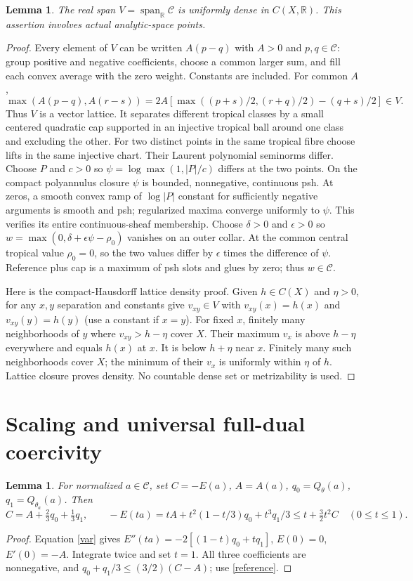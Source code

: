 \documentclass[11pt]{article}
\newtheorem{lemma}[theorem]{Lemma}
\newcommand{\C}{\mathcal C}
\newcommand{\R}{\mathbb R}
\begin{document}
\begin{lemma}\label{dense}
The real span $V=\operatorname{span}_{\R}\C$ is uniformly dense in
$C(X,\R)$. This assertion involves actual analytic-space points.
\end{lemma}
\begin{proof}
Every element of $V$ can be written $A(p-q)$ with $A>0$ and $p,q\in\C$:
group positive and negative coefficients, choose a common larger sum,
and fill each convex average with the zero weight. Constants are included.
For common $A$,
\[
 \max(A(p-q),A(r-s))
 =2A\left[\max((p+s)/2,(r+q)/2)-(q+s)/2\right]\in V.
\]
Thus $V$ is a vector lattice. It separates different tropical classes
by a small centered quadratic cap supported in an injective tropical ball
around one class and excluding the other. For two distinct points in
the same tropical fibre choose lifts in the same injective chart.
Their Laurent polynomial seminorms differ. Choose $P$ and $c>0$ so
$\psi=\log\max(1,|P|/c)$ differs at the two points. On the compact
polyannulus closure $\psi$ is bounded, nonnegative, continuous psh.
At zeros, a smooth convex ramp of $\log|P|$ constant for sufficiently
negative arguments is smooth and psh; regularized maxima converge
uniformly to $\psi$. This verifies its entire continuous-sheaf membership.
Choose $\delta>0$ and $\epsilon>0$ so
$w=\max(0,\delta+\epsilon\psi-\rho_0)$ vanishes on an outer
collar. At the common central tropical value $\rho_0=0$, so the two
values differ by $\epsilon$ times the difference of $\psi$. Reference
plus cap is a maximum of psh slots and glues by zero; thus $w\in\C$.

Here is the compact-Hausdorff lattice density proof. Given $h\in C(X)$
and $\eta>0$, for any $x,y$ separation and constants give $v_{xy}\in V$
with $v_{xy}(x)=h(x)$ and $v_{xy}(y)=h(y)$ (use a constant if $x=y$).
For fixed $x$, finitely many neighborhoods of $y$ where
$v_{xy}>h-\eta$ cover $X$. Their maximum $v_x$ is above $h-\eta$
everywhere and equals $h(x)$ at $x$. It is below $h+\eta$ near $x$.
Finitely many such neighborhoods cover $X$; the minimum of their $v_x$
is uniformly within $\eta$ of $h$. Lattice closure proves density.
No countable dense set or metrizability is used.
\end{proof}

\section{Scaling and universal full-dual coercivity}
\begin{lemma}\label{scale}
For normalized $a\in\C$, set $C=-E(a)$, $A=A(a)$,
$q_0=Q_\theta(a)$, $q_1=Q_{\theta_a}(a)$. Then
\[
 C=A+\tfrac23q_0+\tfrac13q_1,\qquad
 -E(ta)=tA+t^2(1-t/3)q_0+t^3q_1/3
 \le t+\tfrac32t^2C\quad(0\le t\le1).
\]
\end{lemma}
\begin{proof}
Equation \eqref{var} gives $E''(ta)=-2[(1-t)q_0+tq_1]$,
$E(0)=0$, $E'(0)=-A$. Integrate twice and set $t=1$.
All three coefficients are nonnegative, and
$q_0+q_1/3\le(3/2)(C-A)$; use \eqref{reference}.
\end{proof}
\end{document}
